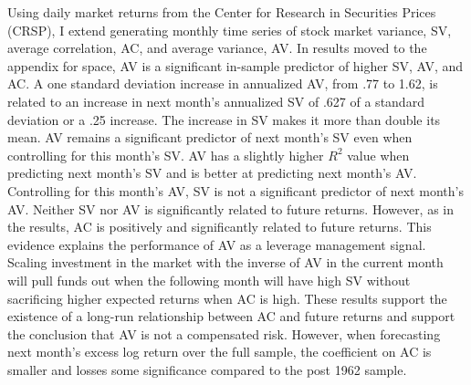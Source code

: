 Using daily market returns from the Center for Research in Securities Prices (CRSP), I extend \citet{pollet_average_2010} generating monthly time series of stock market variance, SV, average correlation, AC, and average variance, AV. In results moved to the appendix for space, AV is a significant in-sample predictor of higher SV, AV, and AC.  A one standard deviation increase in annualized AV, from .77 to 1.62, is related to an increase in next month’s annualized SV of .627 of a standard deviation or a .25 increase. The increase in SV makes it more than double its mean. AV remains a significant predictor of next month’s SV even when controlling for this month's SV. AV has a slightly higher $R^{2}$ value when predicting next month's SV and is better at predicting next month's AV. Controlling for this month's AV, SV is not a significant predictor of next month's AV. Neither SV nor AV is significantly related to future returns. However, as in the \citet{pollet_average_2010} results, AC is positively and significantly related to future returns. %
This evidence explains the performance of AV as a leverage management signal. Scaling investment in the market with the inverse of AV in the current month will pull funds out when the following month will have high SV without sacrificing higher expected returns when AC is high. 
These results support the existence of a long-run relationship between AC and future returns and support the conclusion that AV is not a compensated risk. However, when forecasting next month's excess log return over the full sample, the coefficient on AC is smaller and losses some significance compared to the post 1962 sample. 

